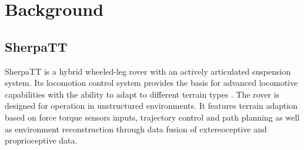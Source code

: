 \documentclass{article}
\begin{document}

\section{Background}


\subsection{SherpaTT}

 SherpaTT is a hybrid wheeled-leg rover with an actively articulated suspension system. Its locomotion control system provides the basis for advanced locomotive capabilities with the ability to adapt to different terrain types \cite{cordes2018}. The rover is designed for operation in unstructured environments. It features terrain adaption based on force torque sensors inputs, trajectory control and path planning as well as environment reconstruction through data fusion of extereoceptive and proprioceptive data.


 
 
\end{document}
